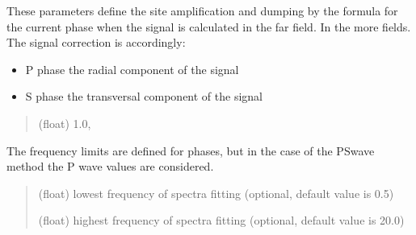 \documentclass[letterpaper,10pt,english]{sphinxmanual}
\begin{document}
\sphinxAtStartPar
These parameters define the site amplification and dumping by the formula for the current phase
when the signal is calculated in the far field.
In the more fields. The signal correction is accordingly:
\begin{itemize}
\item {} 
\sphinxAtStartPar
P phase \sphinxhyphen{} the radial component of the signal

\item {} 
\sphinxAtStartPar
S phase \sphinxhyphen{} the transversal component of the signal

\end{itemize}
\begin{quote}\begin{description}
\sphinxAtStartPar
(float) 1.0, 

\end{description}\end{quote}

\sphinxAtStartPar
The frequency limits are defined for phases, but in the case of the PS\sphinxhyphen{}wave method the
P wave values are considered.
\begin{quote}\begin{description}
\sphinxAtStartPar
(float) lowest frequency of spectra fitting (optional, default value is 0.5)

\sphinxAtStartPar
(float) highest frequency of spectra fitting (optional, default value is 20.0)

\end{description}\end{quote}
\end{document}
